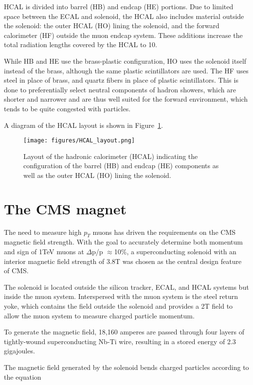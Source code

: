 HCAL is divided into barrel (HB) and endcap (HE) portions. Due to limited space between the ECAL and solenoid, the HCAL also includes material outside the solenoid: the outer HCAL (HO) lining the solenoid, and the forward calorimeter (HF) outside the muon endcap system. These additions increase the total radiation lengths covered by the HCAL to 10.

While HB and HE use the brass-plastic configuration, HO uses the solenoid itself instead of the brass, although the same plastic scintillators are used. The HF uses steel in place of brass, and quartz fibers in place of plastic scintillators. This is done to preferentially select neutral components of hadron showers, which are shorter and narrower and are thus well suited for the forward environment, which tends to be quite congested with particles.

A diagram of the HCAL layout is shown in Figure~\ref{fig:HCAL_layout}.

\begin{figure}\centering
  \texttt{[image: figures/HCAL\_layout.png]}
  \caption{\label{fig:HCAL_layout} Layout of the hadronic calorimeter (HCAL) indicating the configuration of the barrel (HB) and endcap (HE) components as well as the outer HCAL (HO) lining the solenoid.}
\end{figure}

\section{The CMS magnet}

The need to measure high $p_{T}$ muons has driven the requirements on the CMS magnetic field strength. With the goal to accurately determine both momentum and sign of 1TeV muons at $\Delta$p/p $\approx $10\%, a superconducting solenoid with an interior magnetic field strength of 3.8T was chosen as the central design feature of CMS.

The solenoid is located outside the silicon tracker, ECAL, and HCAL systems but inside the muon system. Interspersed with the muon system is the steel return yoke, which contains the field outside the solenoid and provides a 2T field to allow the muon system to measure charged particle momentum. 

To generate the magnetic field, 18,160 amperes are passed through four layers of tightly-wound superconducting Nb-Ti wire, resulting in a stored energy of 2.3 gigajoules.

The magnetic field generated by the solenoid bends charged particles according to the equation



